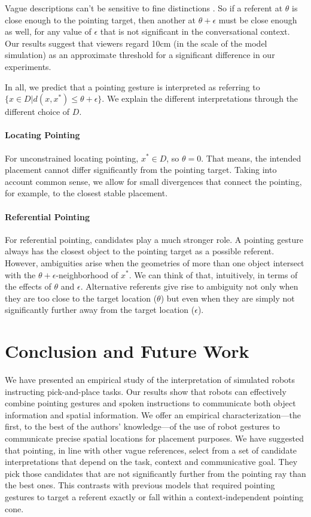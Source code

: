 \documentclass[letterpaper]{article} %
\begin{document}
Vague descriptions can't be sensitive to fine distinctions \cite{graff2000shifting}.  So if a referent at $\theta$ is close enough to the pointing target, then another at $\theta + \epsilon$ must be close enough as well, for any value of $\epsilon$ that is not significant in the conversational context.  Our results suggest that viewers regard 10cm (in the scale of the model simulation) as an approximate threshold for a significant difference in our experiments.

In all, we predict that a pointing gesture is interpreted as referring to $\{x \in D | d(x,x^*) \leq \theta + \epsilon\}.$  We explain the different interpretations through the different choice of $D$.

\paragraph{Locating Pointing}  For unconstrained locating pointing, $x^* \in D$, so $\theta=0$.  That means, the intended placement cannot differ significantly from the pointing target.  Taking into account common sense, we allow for small divergences that connect the pointing, for example, to the closest stable placement.

\paragraph{Referential Pointing}  For referential pointing, candidates play a much stronger role.  A pointing gesture always has the closest object to the pointing target as a possible referent.  However, ambiguities arise when the geometries of more than one object intersect with the $\theta+\epsilon$-neighborhood of $x^*$.   We can think of that, intuitively, in terms of the effects of $\theta$ and $\epsilon$.  Alternative referents give rise to ambiguity not only when they are too close to the target location ($\theta$) but even when they are simply not significantly further away from the target location ($\epsilon$).  



\section{Conclusion and Future Work}
\label{conclusion}

We have presented an empirical study of the interpretation of simulated robots instructing pick-and-place tasks.  Our results show that robots can effectively combine pointing gestures and spoken instructions to communicate both object information and spatial information. We offer an empirical characterization---the first, to the best of the authors' knowledge---of the use of robot gestures to communicate precise spatial locations for placement purposes.  We have suggested that pointing, in line with other vague references, select from a set of candidate interpretations that depend on the task, context and communicative goal.  They pick those candidates that are not significantly further from the pointing ray than the best ones.  This contrasts with previous models that required pointing gestures to target a referent exactly or fall within a context-independent pointing cone.
\end{document}
